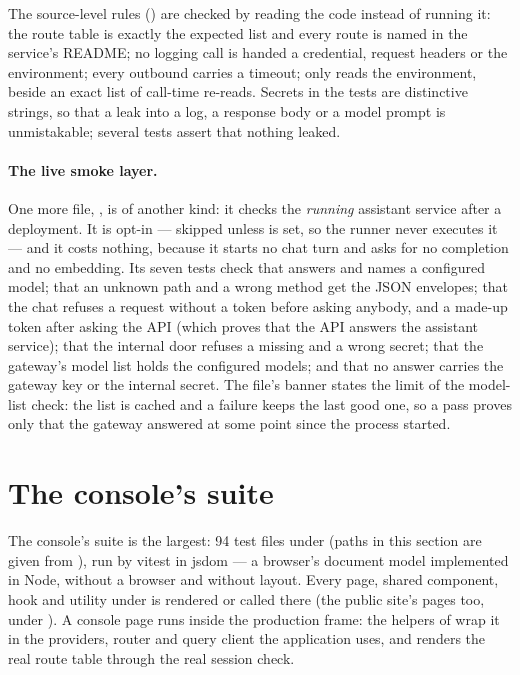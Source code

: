 The source-level rules () are checked by reading the code
instead of running it: the route table is exactly the expected list and every route is named
in the service's README; no logging call is handed a credential, request headers or the
environment; every outbound  carries a timeout; only  reads the
environment, beside an exact list of call-time re-reads. Secrets in the tests are distinctive strings, so that a leak into a log, a
response body or a model prompt is unmistakable; several tests assert that nothing leaked.

\paragraph{The live smoke layer.} One more file, , is of
another kind: it checks the \emph{running} assistant service after a deployment. It is opt-in
--- skipped unless  is set, so the runner never executes it --- and it costs
nothing, because it starts no chat turn and asks for no completion and no embedding. Its seven
tests check that  answers and names a configured model; that an unknown path and
a wrong method get the JSON envelopes; that the chat refuses a request without a token before
asking anybody, and a made-up token after asking the API (which proves that the API answers
the assistant service); that the internal door refuses a missing and a wrong secret; that the
gateway's model list holds the configured models; and that no answer carries the gateway key
or the internal secret. The file's banner states the limit of the model-list check: the list
is cached and a failure keeps the last good one, so a pass proves only that the gateway
answered at some point since the process started.


\section{The console's suite}\label{sec:testing:console}

The console's suite is the largest: 94 test files under  (paths in this
section are given from ), run by vitest in jsdom --- a browser's document model
implemented in Node, without a browser and without layout. Every page, shared component, hook
and utility under  is rendered or called there (the public site's pages too, under
). A console page runs inside the production frame: the helpers of
 wrap it in the providers, router and query
client the application uses, and  renders the real route table through the
real session check.

